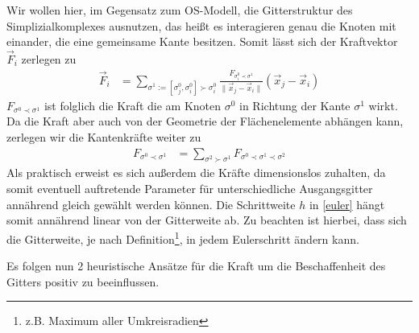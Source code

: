     Wir wollen hier, im Gegensatz zum OS-Modell, die Gitterstruktur des Simplizialkomplexes ausnutzen, das heißt es interagieren genau die Knoten mit einander, die eine gemeinsame Kante besitzen. Somit lässt sich der Kraftvektor \( \vec{F}_{i} \) zerlegen zu
  \begin{align}
    \vec{F}_{i} &= \sum_{\sigma^{1}:=[\sigma^{0}_{j}, \sigma^{0}_{i}]\succ\sigma^{0}_{i}} 
                                  \frac{F_{\sigma^{0}_{i}\prec\sigma^{1}}}{\|\vec{x}_{j} - \vec{x}_{i}\|} \left(\vec{x}_{j} - \vec{x}_{i}\right)
  \end{align}
  \( F_{\sigma^{0}\prec\sigma^{1}} \) ist folglich die Kraft die am Knoten \( \sigma^{0} \) in Richtung der Kante \( \sigma^{1} \) wirkt. 
  Da die Kraft aber auch von der Geometrie der Flächenelemente abhängen kann, zerlegen wir die Kantenkräfte weiter zu
  \begin{align}
    F_{\sigma^{0}\prec\sigma^{1}} &= \sum_{\sigma^{2}\succ\sigma^{1}} F_{\sigma^{0}\prec\sigma^{1}\prec\sigma^{2}}
  \end{align}
  Als praktisch erweist es sich außerdem die Kräfte dimensionslos zuhalten, da somit eventuell auftretende Parameter für unterschiedliche
  Ausgangsgitter annährend gleich gewählt werden können. 
  Die Schrittweite \( h \) in \eqref{euler} hängt somit annährend linear von der Gitterweite ab. 
  Zu beachten ist hierbei, dass sich die Gitterweite, je nach Definition\footnote{z.B. Maximum aller Umkreisradien}, in jedem Eulerschritt ändern kann.

  Es folgen nun 2 heuristische Ansätze für die Kraft um die Beschaffenheit des Gitters positiv zu beeinflussen.

